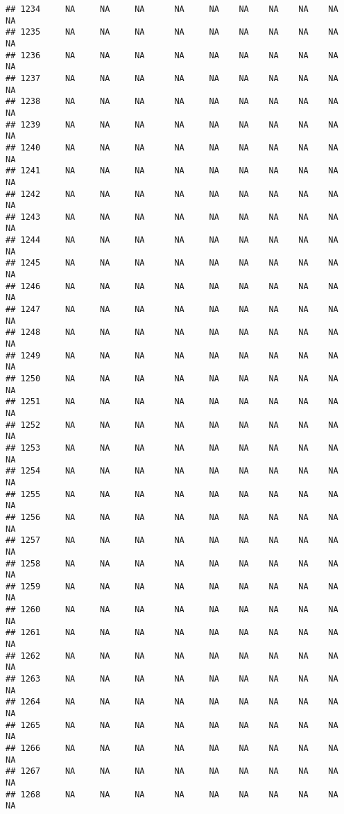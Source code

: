 \documentclass{article}\usepackage{graphicx, color}
\makeatletter
\newenvironment{kframe}{%
 \def\at@end@of@kframe{}%
 \ifinner\ifhmode%
  \def\at@end@of@kframe{\end{minipage}}%
  \begin{minipage}{\columnwidth}%
 \fi\fi%
 \def\FrameCommand##1{\hskip\@totalleftmargin \hskip-\fboxsep
 \colorbox{shadecolor}{##1}\hskip-\fboxsep
     \hskip-\linewidth \hskip-\@totalleftmargin \hskip\columnwidth}%
 \MakeFramed {\advance\hsize-\width
   \@totalleftmargin\z@ \linewidth\hsize
   \@setminipage}}%
 {\par\unskip\endMakeFramed%
 \at@end@of@kframe}
\newenvironment{knitrout}{}{} %
\makeatother
\begin{document}
\begin{knitrout}
\begin{kframe}
\begin{verbatim}
## 1234     NA     NA     NA      NA     NA    NA    NA    NA    NA     NA
## 1235     NA     NA     NA      NA     NA    NA    NA    NA    NA     NA
## 1236     NA     NA     NA      NA     NA    NA    NA    NA    NA     NA
## 1237     NA     NA     NA      NA     NA    NA    NA    NA    NA     NA
## 1238     NA     NA     NA      NA     NA    NA    NA    NA    NA     NA
## 1239     NA     NA     NA      NA     NA    NA    NA    NA    NA     NA
## 1240     NA     NA     NA      NA     NA    NA    NA    NA    NA     NA
## 1241     NA     NA     NA      NA     NA    NA    NA    NA    NA     NA
## 1242     NA     NA     NA      NA     NA    NA    NA    NA    NA     NA
## 1243     NA     NA     NA      NA     NA    NA    NA    NA    NA     NA
## 1244     NA     NA     NA      NA     NA    NA    NA    NA    NA     NA
## 1245     NA     NA     NA      NA     NA    NA    NA    NA    NA     NA
## 1246     NA     NA     NA      NA     NA    NA    NA    NA    NA     NA
## 1247     NA     NA     NA      NA     NA    NA    NA    NA    NA     NA
## 1248     NA     NA     NA      NA     NA    NA    NA    NA    NA     NA
## 1249     NA     NA     NA      NA     NA    NA    NA    NA    NA     NA
## 1250     NA     NA     NA      NA     NA    NA    NA    NA    NA     NA
## 1251     NA     NA     NA      NA     NA    NA    NA    NA    NA     NA
## 1252     NA     NA     NA      NA     NA    NA    NA    NA    NA     NA
## 1253     NA     NA     NA      NA     NA    NA    NA    NA    NA     NA
## 1254     NA     NA     NA      NA     NA    NA    NA    NA    NA     NA
## 1255     NA     NA     NA      NA     NA    NA    NA    NA    NA     NA
## 1256     NA     NA     NA      NA     NA    NA    NA    NA    NA     NA
## 1257     NA     NA     NA      NA     NA    NA    NA    NA    NA     NA
## 1258     NA     NA     NA      NA     NA    NA    NA    NA    NA     NA
## 1259     NA     NA     NA      NA     NA    NA    NA    NA    NA     NA
## 1260     NA     NA     NA      NA     NA    NA    NA    NA    NA     NA
## 1261     NA     NA     NA      NA     NA    NA    NA    NA    NA     NA
## 1262     NA     NA     NA      NA     NA    NA    NA    NA    NA     NA
## 1263     NA     NA     NA      NA     NA    NA    NA    NA    NA     NA
## 1264     NA     NA     NA      NA     NA    NA    NA    NA    NA     NA
## 1265     NA     NA     NA      NA     NA    NA    NA    NA    NA     NA
## 1266     NA     NA     NA      NA     NA    NA    NA    NA    NA     NA
## 1267     NA     NA     NA      NA     NA    NA    NA    NA    NA     NA
## 1268     NA     NA     NA      NA     NA    NA    NA    NA    NA     NA

\end{verbatim}
\end{kframe}
\end{knitrout}
\end{document}
